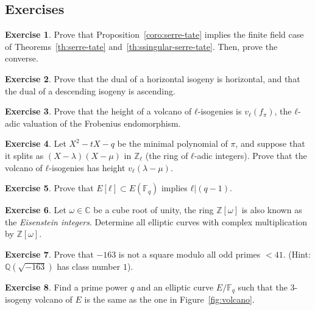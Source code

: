 \documentclass[10pt]{article}
\theoremstyle{plain}
\theoremstyle{definition}
\newtheorem{exercise}{Exercise}[part]
\def\F{\ensuremath{\mathbb{F}}}
\begin{document}
\begin{prposition}
\section*{Exercises}

\begin{exercise}
  Prove that Proposition~\ref{coro:serre-tate} implies the finite
  field case of Theorems~\ref{th:serre-tate}
  and~\ref{th:ssingular-serre-tate}. %
  Then, prove the converse.
\end{exercise}

\begin{exercise}
  Prove that the dual of a horizontal isogeny is horizontal, and that
  the dual of a descending isogeny is ascending.
\end{exercise}

\begin{exercise}
  Prove that the height of a volcano of $ℓ$-isogenies is $v_ℓ(f_π)$,
  the $ℓ$-adic valuation of the Frobenius endomorphism.
\end{exercise}

\begin{exercise}
  Let $X^2-tX-q$ be the minimal polynomial of $π$, and suppose that it
  splits as $(X-λ)(X-μ)$ in $ℤ_ℓ$ (the ring of $ℓ$-adic integers). %
  Prove that the volcano of $ℓ$-isogenies has height $v_ℓ(λ-μ)$.
\end{exercise}

\begin{exercise}
  \label{ex:group-struct}
  Prove that $E[ℓ]⊂E(\F_q)$ implies $ℓ|(q-1)$.
\end{exercise}

\begin{exercise}
  Let $ω∈ℂ$ be a cube root of unity, the ring $ℤ[ω]$ is also known as
  the \emph{Eisenstein integers}. %
  Determine all elliptic curves with complex multiplication by $ℤ[ω]$.
\end{exercise}

\begin{exercise}
  Prove that $-163$ is not a square modulo all odd primes
  $<41$. (Hint: $ℚ(\sqrt{-163})$ has class number $1$).
\end{exercise}

\begin{exercise}
  Find a prime power $q$ and an elliptic curve $E/\F_q$ such that the
  $3$-isogeny volcano of $E$ is the same as the one in
  Figure~\ref{fig:volcano}.
\end{exercise}




\end{prposition}
\end{document}
